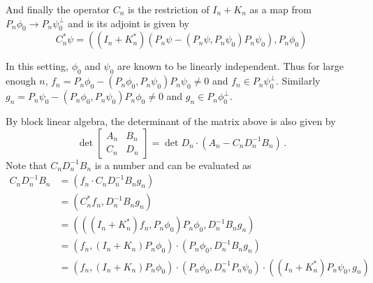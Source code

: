 And finally the operator $C_{n}$ is the restriction of $I_{n} + K_{n}$ as a map from
$P_{n} \phi_{0} \to P_{n} \psi_{0}^{\perp}$ and is its adjoint is given by
\begin{equation}
C_{n}^{\ast}\psi = \left( (I_{n} + K_{n}^{\ast}) \left(P_{n} \psi - (P_{n} \psi, P_{n} \psi_{0}) P_{n} \psi_{0} \right), P_{n} \phi_{0} \right)
\end{equation}

In this setting, $\phi_{0}$ and $\psi_{0}$ are known to be linearly independent.
Thus for large enough $n$, 
$f_{n} = P_{n} \phi_{0} - (P_{n} \phi_{0}, P_{n} \psi_{0}) P_{n} \psi_{0} \neq 0$
and $f_{n} \in P_{n} \psi_{0}^{\perp}$.
Similarly $g_{n} = P_{n} \psi_{0} - (P_{n}\phi_{0}, P_{n} \psi_{0}) P_{n} \phi_{0} \neq 0$
and $g_{n} \in P_{n} \phi_{0}^{\perp}$.

By block linear algebra, the determinant of the matrix above is also given by
\begin{equation}
\det{
\begin{bmatrix}
A_{n} & B_{n} \\
C_{n} & D_{n} 
\end{bmatrix} 
}
= \det{D_{n}} \cdot (A_{n} - C_{n} D_{n}^{-1} B_{n}) \,.
\end{equation}
Note that $C_{n} D_{n}^{-1} B_{n}$ is a number and can be evaluated as 
\begin{equation}
\begin{aligned}
C_{n} D_{n}^{-1} B_{n} &= 
\left( f_{n} \cdot  C_{n} D_{n}^{-1} B_{n} g_{n} \right) \\
&= \left( C_{n}^{\ast} f_{n}, D_{n}^{-1} B_{n} g_{n} \right) \\
&= \left( \left((I_{n} + K_{n}^{\ast})f_{n}, P_{n} \phi_{0}\right) P_{n} \phi_{0}, D_{n}^{-1} B_{n} g_{n} \right) \\
&= \left(f_{n}, (I_{n} + K_{n})P_{n} \phi_{0} \right) \cdot (P_{n} \phi_{0}, D_{n}^{-1} B_{n} g_{n}) \\
&= \left(f_{n}, (I_{n} + K_{n})P_{n} \phi_{0} \right) \cdot (P_{n} \phi_{0}, D_{n}^{-1} P_{n} \psi_{0})  \cdot 
\left((I_{n} + K_{n}^{\ast})P_{n} \psi_{0}, g_{n}  \right) \\
\end{aligned}
\end{equation}
